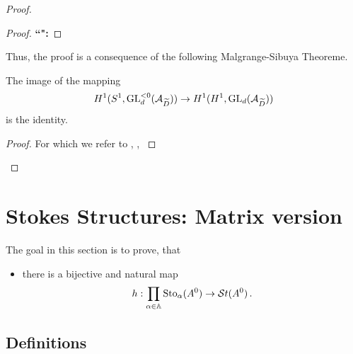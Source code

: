 \begin{proof}
\begin{proof}
    \textbf{``\Leftarrow{}":}
    \TODO
  \end{proof}

  Thus, the proof is a consequence of the following Malgrange-Sibuya Theoreme.
  \begin{thm}
    The image of the mapping
    \[
      H^1(S^1,\operatorname{GL}_d^{<0}(\mathcal{A}_{\widetilde D}))
      \to
      H^1(H^1,\operatorname{GL}_d(\mathcal{A}_{\widetilde D}))
    \] 
    is the identity.
  \end{thm}
  \begin{proof}
     For which we refer to 
     \cite[Th.A.1]{Malgrange1983},
     \cite[Th.6.4.1]{sibuya1990Linear},
     \cite{babbitt1989local}
  \end{proof}
\end{proof}

\section{Stokes Structures: Matrix version}
\begin{comment}
  See
  \begin{itemize}
    \item \cite{Loday1994}
    \item \cite{boalch} and \cite{thboalch}
    \item \cite{babbitt1989local}
  \end{itemize}
\end{comment}
The goal in this section is to prove, that
\begin{itemize}
  \item[] there is a bijective and natural map
    \[
      h:\prod_{\alpha\in\mathbb{A}}\operatorname{Sto}_\alpha(A^0)\to\mathcal{S}{}t(A^0) \,.
    \]
\end{itemize}

\subsection{Definitions}
